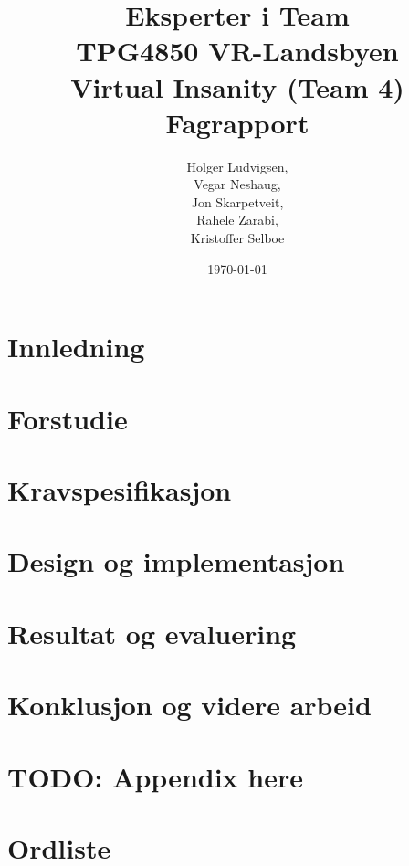 \documentclass[12pt]{report}
\title{{\Large Eksperter i Team\\TPG4850 VR-Landsbyen\\{\bf Virtual Insanity (Team 4)\\Fagrapport}}}
\author{Holger Ludvigsen,\\Vegar Neshaug,\\Jon Skarpetveit,\\Rahele Zarabi,\\Kristoffer Selboe}
\date{{\small \today}}
\begin{document}
\maketitle



\pagebreak
	
\setlength{\parskip}{0.0in}
\tableofcontents
\listoftables
\listoffigures

\pagebreak
\setlength{\parskip}{0.1in}

\setcounter{page}{1} %

\chapter{Innledning}

	

\chapter{Forstudie}

	

\chapter{Kravspesifikasjon}

	
	
\chapter{Design og implementasjon}

	

\chapter{Resultat og evaluering}

	

\chapter{Konklusjon og videre arbeid}

	

\appendix

	\chapter{TODO: Appendix here}

\pagestyle{plain}
\pagebreak
{}
\setcounter{page}{1} %

\chapter{Ordliste}

	

	

\end{document}
